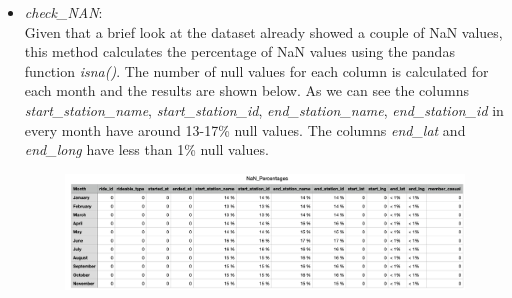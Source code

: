 \documentclass[12pt]{article}
\begin{document}
\begin{itemize}
	\item \textit{check\_NAN}:\\
	Given that a brief look at the dataset already showed a couple of NaN values, this method calculates the percentage of NaN values using the pandas function \textit{isna()}. The number of null values for each column is calculated for each month and the results are shown below. As we can see the columns \textit{start\_station\_name}, \textit{start\_station\_id}, \textit{end\_station\_name}, \textit{end\_station\_id} in every month have around 13-17\% null values. The columns \textit{end\_lat} and \textit{end\_long} have less than 1\% null values. 
	\begin{figure}[ht]
	\includegraphics[width=6.5 in, height = 2 in]{imgNAN.png}
	\end{figure}
	 
	
\end{itemize} 
\end{document}
